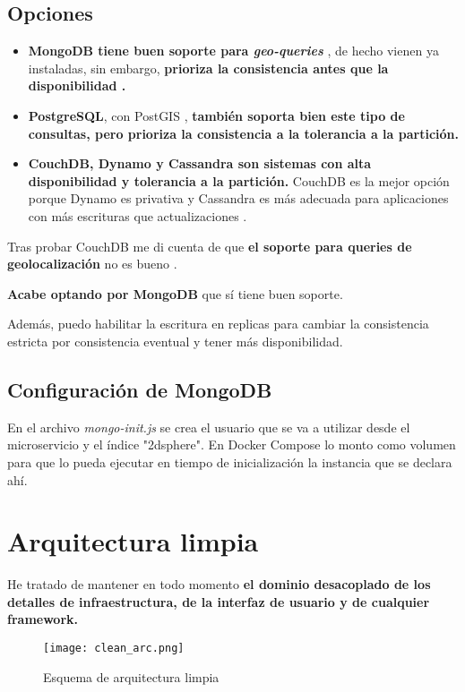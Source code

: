 \subsection{Opciones}

\begin{itemize}
	\item \textbf{MongoDB tiene buen soporte para \textit{geo-queries}} \cite{mongo}, de hecho vienen ya instaladas, sin embargo, \textbf{prioriza la consistencia antes que la disponibilidad \cite{mongo-cap}.} 
\item \textbf{PostgreSQL}, con PostGIS \cite{postgis}, \textbf{también soporta bien este tipo de consultas, pero prioriza la consistencia a la tolerancia a la partición.} 
\item \textbf{CouchDB, Dynamo y Cassandra son sistemas con alta disponibilidad y tolerancia a la partición.} CouchDB es la mejor opción porque Dynamo es privativa y Cassandra es más adecuada para aplicaciones con más
escrituras que actualizaciones \cite{cassandra}. 
\end{itemize}



Tras probar CouchDB me di cuenta de que \textbf{el soporte para queries de geolocalización} no es bueno \cite{couchdb}.

\textbf{Acabe optando por MongoDB} que sí tiene buen soporte.

Además, puedo habilitar la escritura en replicas para cambiar la consistencia estricta por consistencia eventual y tener más disponibilidad. 

\subsection{Configuración de MongoDB}

En el archivo \textit{mongo-init.js} se crea el usuario que se va a utilizar desde el microservicio y el índice "2dsphere". 
En Docker Compose lo monto como volumen para que lo pueda ejecutar en tiempo de inicialización la instancia que se declara ahí.

\section{Arquitectura limpia}\label{sec:clean}

He tratado de mantener en todo momento \textbf{el dominio desacoplado de los detalles de infraestructura, de la interfaz de usuario y de cualquier framework.}
\begin{figure}[H]
	\centering	
	\texttt{[image: clean\_arc.png]}
	\caption{Esquema de arquitectura limpia \cite{clean-arch}}
	\end{figure}

